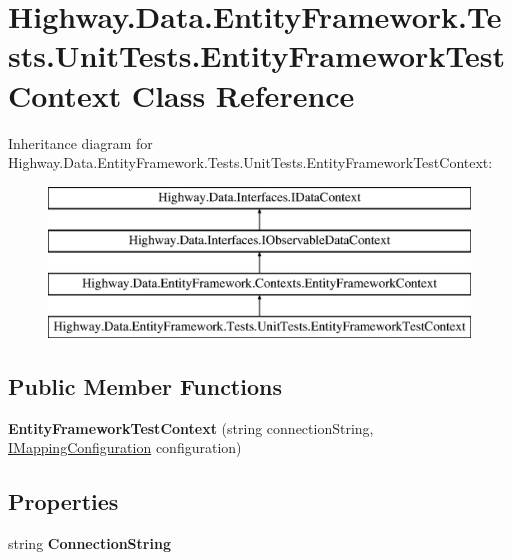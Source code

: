 \hypertarget{class_highway_1_1_data_1_1_entity_framework_1_1_tests_1_1_unit_tests_1_1_entity_framework_test_context}{\section{Highway.\-Data.\-Entity\-Framework.\-Tests.\-Unit\-Tests.\-Entity\-Framework\-Test\-Context Class Reference}
\label{class_highway_1_1_data_1_1_entity_framework_1_1_tests_1_1_unit_tests_1_1_entity_framework_test_context}
}
Inheritance diagram for Highway.\-Data.\-Entity\-Framework.\-Tests.\-Unit\-Tests.\-Entity\-Framework\-Test\-Context\-:\begin{figure}[H]
\begin{center}
\leavevmode
\includegraphics[height=4.000000cm]{class_highway_1_1_data_1_1_entity_framework_1_1_tests_1_1_unit_tests_1_1_entity_framework_test_context}
\end{center}
\end{figure}
\subsection*{Public Member Functions}
\begin{DoxyCompactItemize}
\item 
\hypertarget{class_highway_1_1_data_1_1_entity_framework_1_1_tests_1_1_unit_tests_1_1_entity_framework_test_context_ab8f55dea2dcbf9d8db2fa2ffd3ece779}{{\bfseries Entity\-Framework\-Test\-Context} (string connection\-String, \hyperlink{interface_highway_1_1_data_1_1_entity_framework_1_1_mappings_1_1_i_mapping_configuration}{I\-Mapping\-Configuration} configuration)}\label{class_highway_1_1_data_1_1_entity_framework_1_1_tests_1_1_unit_tests_1_1_entity_framework_test_context_ab8f55dea2dcbf9d8db2fa2ffd3ece779}

\end{DoxyCompactItemize}
\subsection*{Properties}
\begin{DoxyCompactItemize}
\item 
\hypertarget{class_highway_1_1_data_1_1_entity_framework_1_1_tests_1_1_unit_tests_1_1_entity_framework_test_context_a5f71be3c605cf9bbc4bfe7fad70b8e42}{string {\bfseries Connection\-String}}\label{class_highway_1_1_data_1_1_entity_framework_1_1_tests_1_1_unit_tests_1_1_entity_framework_test_context_a5f71be3c605cf9bbc4bfe7fad70b8e42}

\end{DoxyCompactItemize}

